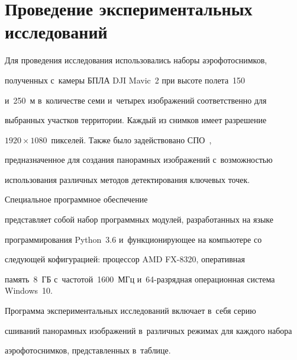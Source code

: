   


  \section{Проведение экспериментальных исследований }


  


  Для проведения исследования использовались наборы аэро\-фо\-то\-сним\-ков, 


полученных с~камеры БПЛА {DJI Mavic~2} при высоте полета~150 


и~250~м в~количестве семи и~четырех изображений соответственно для 


вы\-бран\-ных участ\-ков территории. Каж\-дый из снимков имеет разрешение 


$1920\times1080$~пикселей. Также было задействовано СПО~\cite{14-arh}, 


пред\-на\-зна\-чен\-ное для создания па\-но\-рам\-ных изображений с~воз\-мож\-ностью 


использования различных методов де\-тек\-ти\-ро\-ва\-ния ключевых точек. 


Специальное программное обеспечение 


пред\-став\-ля\-ет собой набор программных модулей, разработанных на языке 


программирования {Python~3.6} и~функционирующее на компьютере со 


сле\-ду\-ющей кофигурацией: процессор {AMD FX-8320}, оперативная 


память~8~ГБ с~час\-то\-той~1600~МГц и~64-раз\-ряд\-ная операционная сис\-те\-ма {Windows~10}.


  


  Программа экспериментальных исследований включает в~себя серию 


сши\-ва\-ний па\-но\-рам\-ных изображений в~различных режимах для каж\-до\-го набора 


аэро\-фо\-то\-сним\-ков, пред\-став\-лен\-ных в~таб\-лице.


  


